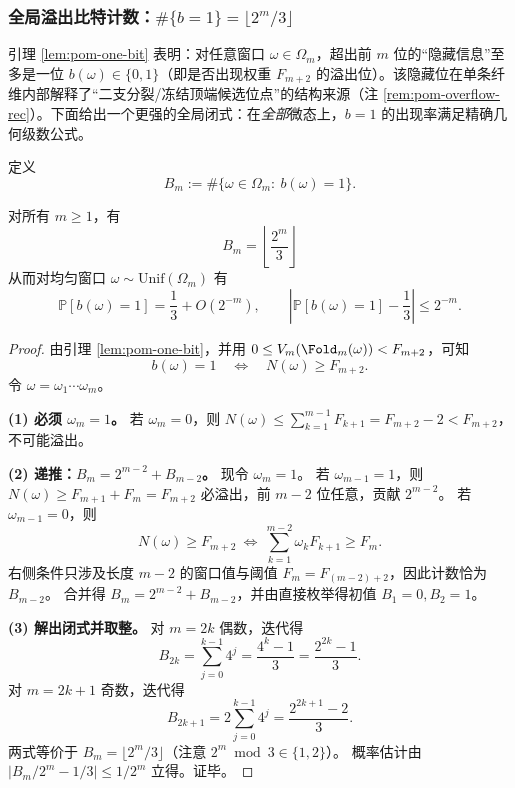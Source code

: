 \subsubsection{全局溢出比特计数：\texorpdfstring{$\#\{b=1\}=\lfloor 2^m/3\rfloor$}{b=1 count = floor(2^m/3)}}\label{subsec:pom-overflow-global}
引理 \ref{lem:pom-one-bit} 表明：对任意窗口 \(\omega\in\Omega_m\)，超出前 \(m\) 位的“隐藏信息”至多是一位 \(b(\omega)\in\{0,1\}\)（即是否出现权重 \(F_{m+2}\) 的溢出位）。该隐藏位在单条纤维内部解释了“二支分裂/冻结顶端候选位点”的结构来源（注 \ref{rem:pom-overflow-rec}）。下面给出一个更强的全局闭式：在\emph{全部}微态上，\(b=1\) 的出现率满足精确几何级数公式。

\begin{definition}[全局溢出计数]\label{def:pom-overflow-global-count}
定义
\[
B_m:=\#\{\omega\in\Omega_m:\ b(\omega)=1\}.
\]
\end{definition}

\begin{theorem}[全局溢出比特的精确闭式]\label{thm:pom-overflow-global-count}
对所有 \(m\ge 1\)，有
\[
\boxed{\;
B_m=\left\lfloor\frac{2^m}{3}\right\rfloor\;}
\]
从而对均匀窗口 \(\omega\sim\mathrm{Unif}(\Omega_m)\) 有
\[
\mathbb{P}[b(\omega)=1]=\frac{1}{3}+O(2^{-m}),
\qquad
\left|\mathbb{P}[b(\omega)=1]-\frac{1}{3}\right|\le 2^{-m}.
\]
\end{theorem}
\begin{proof}
由引理 \ref{lem:pom-one-bit}，并用 \(0\le V_m(\Fold_m(\omega))<F_{m+2}\)，可知
\[
b(\omega)=1
\quad\Longleftrightarrow\quad
N(\omega)\ge F_{m+2}.
\]
令 \(\omega=\omega_1\cdots\omega_m\)。

\textbf{(1) 必须 \(\omega_m=1\)。}
若 \(\omega_m=0\)，则
\(
N(\omega)\le \sum_{k=1}^{m-1}F_{k+1}=F_{m+2}-2<F_{m+2}
\)，不可能溢出。

\textbf{(2) 递推：\(B_m=2^{m-2}+B_{m-2}\)。}
现令 \(\omega_m=1\)。
若 \(\omega_{m-1}=1\)，则
\(
N(\omega)\ge F_{m+1}+F_m=F_{m+2}
\)
必溢出，前 \(m-2\) 位任意，贡献 \(2^{m-2}\)。
若 \(\omega_{m-1}=0\)，则
\[
N(\omega)\ge F_{m+2}
\ \Longleftrightarrow\
\sum_{k=1}^{m-2}\omega_kF_{k+1}\ge F_m.
\]
右侧条件只涉及长度 \(m-2\) 的窗口值与阈值 \(F_m=F_{(m-2)+2}\)，因此计数恰为 \(B_{m-2}\)。
合并得 \(B_m=2^{m-2}+B_{m-2}\)，并由直接枚举得初值 \(B_1=0,B_2=1\)。

\textbf{(3) 解出闭式并取整。}
对 \(m=2k\) 偶数，迭代得
\[
B_{2k}=\sum_{j=0}^{k-1}4^j=\frac{4^k-1}{3}=\frac{2^{2k}-1}{3}.
\]
对 \(m=2k+1\) 奇数，迭代得
\[
B_{2k+1}=2\sum_{j=0}^{k-1}4^j=\frac{2^{2k+1}-2}{3}.
\]
两式等价于 \(B_m=\lfloor 2^m/3\rfloor\)（注意 \(2^m\bmod 3\in\{1,2\}\)）。
概率估计由
\(
\bigl|B_m/2^m-1/3\bigr|\le 1/2^m
\)
立得。证毕。
\end{proof}


